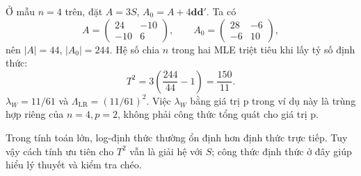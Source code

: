 \begin{example}
Ở mẫu $n=4$ trên, đặt $A=3S$, $A_0=A+4\mathbf d\mathbf d'$.
Ta có
\[
 A=\begin{pmatrix}24&-10\\-10&6\end{pmatrix},\qquad
 A_0=\begin{pmatrix}28&-6\\-6&10\end{pmatrix},
\]
nên $|A|=44$, $|A_0|=244$.
Hệ số chia $n$ trong hai MLE triệt tiêu khi lấy tỷ số định thức:
\[
 T^2=3\left(\frac{244}{44}-1\right)=\frac{150}{11}.
\]
$\lambda_W=11/61$ và $\Lambda_{\mathrm{LR}}=(11/61)^2$.
Việc $\lambda_W$ bằng giá trị p trong ví dụ này là trùng hợp riêng của
$n=4,p=2$, không phải công thức tổng quát cho giá trị p.
\end{example}

Trong tính toán lớn, log-định thức thường ổn định hơn định thức trực tiếp.
Tuy vậy cách tính ưu tiên cho $T^2$ vẫn là giải hệ với $S$; công thức định
thức ở đây giúp hiểu lý thuyết và kiểm tra chéo.
